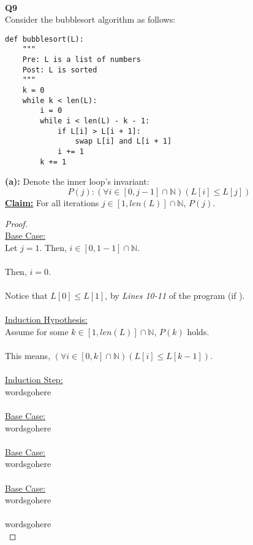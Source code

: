 \documentclass[12pt]{article}
\begin{document}
\leavevmode\\
\textbf{Q9} \\
Consider the bubblesort algorithm as follows:
\begin{lstlisting}
def bubblesort(L):
    """
    Pre: L is a list of numbers
    Post: L is sorted
    """
    k = 0
    while k < len(L):
        i = 0
        while i < len(L) - k - 1:
            if L[i] > L[i + 1]:
                swap L[i] and L[i + 1]
            i += 1
        k += 1
\end{lstlisting}
\textbf{(a):} Denote the inner loop's invariant:
\[P(j): (\forall i \in [0, j - 1] \cap \mathbb{N})(L[i] \leq L[j])\]
\textbf{\underline{Claim:}} For all iterations $j \in [1, len(L)] \cap \mathbb{N}$, $P(j)$.
\begin{proof}
\leavevmode\\
    \underline{Base Case:} \\
    Let $j = 1$. Then, $i \in [0, 1 - 1] \cap \mathbb{N}$. \\
    \\
    Then, $i = 0$. \\
    \\
    Notice that $L[0] \leq L[1]$, by \textit{Lines 10-11} of the program (if ). \\
    \\
    \underline{Induction Hypothesis:} \\
    Assume for some $k \in [1, len(L)] \cap \mathbb{N}$, $P(k)$ holds. \\
    \\
    This means, $(\forall i \in [0, k] \cap \mathbb{N})(L[i] \leq L[k - 1])$. \\
    \\
    \underline{Induction Step:} \\
    wordsgohere \\
    \\
    \underline{Base Case:} \\
    wordsgohere \\
    \\
    \underline{Base Case:} \\
    wordsgohere \\
    \\
    \underline{Base Case:} \\
    wordsgohere \\
    \\
    wordsgohere \\
\end{proof}
\leavevmode
\end{document}

